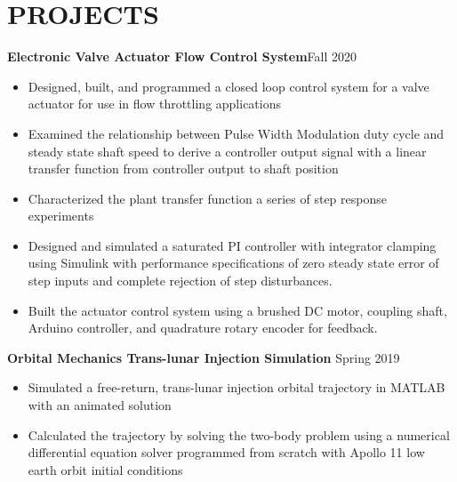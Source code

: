 \documentclass{article}
\begin{document}
\section{PROJECTS}
\textbf{Electronic Valve Actuator Flow Control System}\hfill Fall 2020
\vspace{0.5em}
\begin{itemize}
	\item Designed, built, and programmed a closed loop control system for a valve actuator for use in flow throttling applications
	\item Examined the relationship between Pulse Width Modulation duty cycle and steady state shaft speed to derive a controller output signal with a linear transfer function from controller output to shaft position  
	\item Characterized the plant transfer function a series of step response experiments
	\item  Designed and simulated a saturated PI controller with integrator clamping using Simulink with performance specifications of zero steady state error of step inputs and complete rejection of step disturbances.
	\item  Built the actuator control system using a brushed DC motor, coupling shaft, Arduino controller, and quadrature rotary encoder for feedback.
\end{itemize}
\vspace{0.5em}
\textbf{Orbital Mechanics Trans-lunar Injection Simulation} 
\hfill
Spring 2019
\vspace{0.5em}
\begin{itemize}
	\item Simulated a free-return, trans-lunar injection orbital trajectory in MATLAB with an animated solution
	\item Calculated the trajectory by solving the two-body problem using a numerical differential equation solver programmed from scratch with Apollo 11 low earth orbit initial conditions
\end{itemize}

\thispagestyle{empty}
\end{document}
